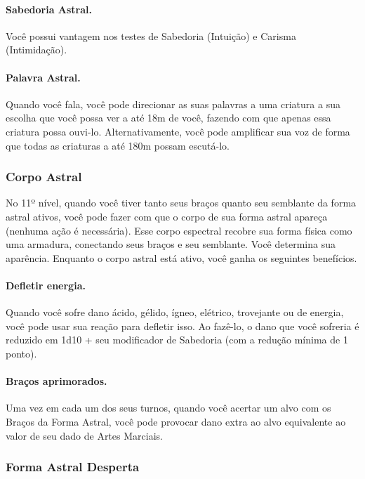 \begin{multicols}{2}
\paragraph{Sabedoria Astral.}%
Você possui vantagem nos testes de Sabedoria (Intuição) e Carisma (Intimidação).

\paragraph{Palavra Astral.}%
Quando você fala, você pode direcionar as suas palavras a uma criatura a sua
escolha que você possa ver a até 18m de você, fazendo com que apenas essa
criatura possa ouvi-lo. Alternativamente, você pode amplificar sua voz de forma
que todas as criaturas a até 180m possam escutá-lo.

\subsubsection*{Corpo Astral}%
\label{ssub:corpo_astral}

No 11º nível, quando você tiver tanto seus braços quanto seu semblante da forma
astral ativos, você pode fazer com que o corpo de sua forma astral apareça
(nenhuma ação é necessária). Esse corpo espectral recobre sua forma física como
uma armadura, conectando seus braços e seu semblante. Você determina sua
aparência. Enquanto o corpo astral está ativo, você ganha os seguintes
benefícios.

\paragraph{Defletir energia.}%
Quando você sofre dano ácido, gélido, ígneo, elétrico, trovejante ou de energia,
você pode usar sua reação para defletir isso. Ao fazê-lo, o dano que você
sofreria é reduzido em 1d10 + seu modificador de Sabedoria (com a redução mínima
de 1 ponto).

\paragraph{Braços aprimorados.}%
Uma vez em cada um dos seus turnos, quando você acertar um alvo com os Braços da
Forma Astral, você pode provocar dano extra ao alvo equivalente ao valor de seu
dado de Artes Marciais.

\subsubsection*{Forma Astral Desperta}%
\label{ssub:forma_astral_desperta}


\end{multicols}
